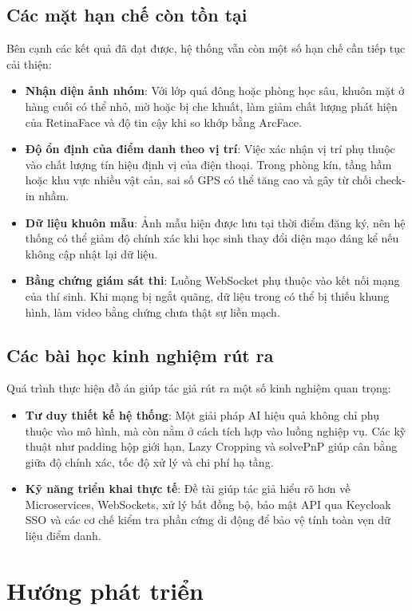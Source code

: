 \documentclass[../DoAn.tex]{subfiles}
\begin{document}
\subsection{Các mặt hạn chế còn tồn tại}
Bên cạnh các kết quả đã đạt được, hệ thống vẫn còn một số hạn chế cần tiếp tục cải thiện:
\begin{itemize}
    \item \textbf{Nhận diện ảnh nhóm}: Với lớp quá đông hoặc phòng học sâu, khuôn mặt ở hàng cuối có thể nhỏ, mờ hoặc bị che khuất, làm giảm chất lượng phát hiện của RetinaFace và độ tin cậy khi so khớp bằng ArcFace.
    \item \textbf{Độ ổn định của điểm danh theo vị trí}: Việc xác nhận vị trí phụ thuộc vào chất lượng tín hiệu định vị của điện thoại. Trong phòng kín, tầng hầm hoặc khu vực nhiều vật cản, sai số GPS có thể tăng cao và gây từ chối check-in nhầm.
    \item \textbf{Dữ liệu khuôn mẫu}: Ảnh mẫu hiện được lưu tại thời điểm đăng ký, nên hệ thống có thể giảm độ chính xác khi học sinh thay đổi diện mạo đáng kể nếu không cập nhật lại dữ liệu.
    \item \textbf{Bằng chứng giám sát thi}: Luồng WebSocket phụ thuộc vào kết nối mạng của thí sinh. Khi mạng bị ngắt quãng, dữ liệu trong  có thể bị thiếu khung hình, làm video bằng chứng chưa thật sự liền mạch.
\end{itemize}

\subsection{Các bài học kinh nghiệm rút ra}
Quá trình thực hiện đồ án giúp tác giả rút ra một số kinh nghiệm quan trọng:
\begin{itemize}
    \item \textbf{Tư duy thiết kế hệ thống}: Một giải pháp AI hiệu quả không chỉ phụ thuộc vào mô hình, mà còn nằm ở cách tích hợp vào luồng nghiệp vụ. Các kỹ thuật như padding hộp giới hạn, Lazy Cropping và solvePnP giúp cân bằng giữa độ chính xác, tốc độ xử lý và chi phí hạ tầng.
    \item \textbf{Kỹ năng triển khai thực tế}: Đề tài giúp tác giả hiểu rõ hơn về Microservices, WebSockets, xử lý bất đồng bộ, bảo mật API qua Keycloak SSO và các cơ chế kiểm tra phần cứng di động để bảo vệ tính toàn vẹn dữ liệu điểm danh.
\end{itemize}

\section{Hướng phát triển}
\label{section:6.2}
\end{document}
